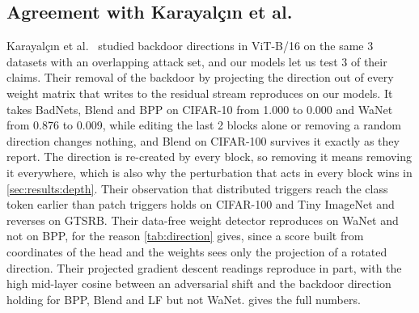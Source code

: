 \subsection{Agreement with Karayal\c{c}{\i}n et al.}
\label{sec:mechanism:picek}

Karayal\c{c}{\i}n et al.~\cite{karayalcin2026backdoor} studied backdoor directions in ViT-B/16 on the same 3 datasets with an overlapping attack set, and our models let us test 3 of their claims. Their removal of the backdoor by projecting the direction out of every weight matrix that writes to the residual stream reproduces on our models. It takes BadNets, Blend and BPP on CIFAR-10 from 1.000 to 0.000 and WaNet from 0.876 to 0.009, while editing the last 2 blocks alone or removing a random direction changes nothing, and Blend on CIFAR-100 survives it exactly as they report. The direction is re-created by every block, so removing it means removing it everywhere, which is also why the perturbation that acts in every block wins in \cref{sec:results:depth}. Their observation that distributed triggers reach the class token earlier than patch triggers holds on CIFAR-100 and Tiny ImageNet and reverses on GTSRB. Their data-free weight detector reproduces on WaNet and not on BPP, for the reason \cref{tab:direction} gives, since a score built from coordinates of the head and the weights sees only the projection of a rotated direction. Their projected gradient descent readings reproduce in part, with the high mid-layer cosine between an adversarial shift and the backdoor direction holding for BPP, Blend and LF but not WaNet.  gives the full numbers.
